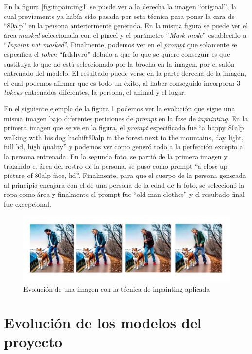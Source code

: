 En la figura \ref{fig:inpainting1} se puede ver a la derecha la imagen ``original'', la cual previamente ya había sido pasada por esta técnica para poner la cara de ``80alp'' en la persona anteriormente generada. En la misma figura se puede ver el área \textit{masked} seleccionada con el pincel y el parámetro ``\textit{Mask mode}'' establecido a ``\textit{Inpaint not masked}''. Finalmente, podemos ver en el \textit{prompt} que solamente se especifica el \textit{token} ``frdslivro'' debido a que lo que se quiere conseguir es que sustituya lo que no está seleccionado por la brocha en la imagen, por el salón entrenado del modelo. El resultado puede verse en la parte derecha de la imagen, el cual podemos afirmar que es todo un éxito, al haber conseguido incorporar 3 \textit{tokens} entrenados diferentes, la persona, el animal y el lugar. 

En el siguiente ejemplo de la figura \ref{fig:fasesinpainting} podemos ver la evolución que sigue una misma imagen bajo diferentes peticiones de \textit{prompt} en la fase de \textit{inpainting}. En la primera imagen que se ve en la figura, el \textit{prompt} especificado fue ``a happy 80alp walking with his dog hachift80alp in the forest next to the mountains, day light, full hd, high quality'' y podemos ver como generó todo a la perfección excepto a la persona entrenada. En la segunda foto, se partió de la primera imagen y trazando el área del rostro de la persona, se puso como prompt ``a close up picture of 80alp face, hd''. Finalmente, para que el cuerpo de la persona generada al principio encajara con el de una persona de la edad de la foto, se seleccionó la ropa como área y finalmente el prompt fue ``old man clothes'' y el resultado final fue excepcional. 

\begin{figure}[h]
	\centering
	\includegraphics[width = 1.1
	\textwidth]{Imagenes/Vectorial/fasesinpainting.png}
	\caption{Evolución de una imagen con la técnica de inpainting aplicada}
	\label{fig:fasesinpainting}
\end{figure}

\section{Evolución de los modelos del proyecto}

